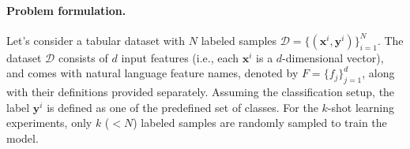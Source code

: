 \vspace*{-0.12in}
\paragraph{Problem formulation.} Let's consider a tabular dataset with $N$ labeled samples $\mathcal{D} = \{(\mathbf{x}^i, \mathbf{y}^i)\}_{i=1}^{N}$. The dataset $\mathcal{D}$ consists of $d$ input features (i.e., each $\mathbf{x}^i$ is a $d$-dimensional vector), and comes with natural language feature names, denoted by $F = \{f_j\}_{j=1}^{d}$, along with their definitions provided separately. Assuming the classification setup, the label $\mathbf{y}^i$ is defined as one of the predefined set of classes. For the $k$-shot learning experiments, only $k$ ($<N$) labeled samples are randomly sampled to train the model.

